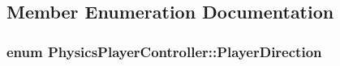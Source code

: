 \subsection{Member Enumeration Documentation}
\subsubsection[{\texorpdfstring{Player\+Direction}{PlayerDirection}}]{\setlength{\rightskip}{0pt plus 5cm}enum {\bf Physics\+Player\+Controller\+::\+Player\+Direction}}\hypertarget{classPhysicsPlayerController_a947993cc77a553b6a30c9ea95c81de5e}{}\label{classPhysicsPlayerController_a947993cc77a553b6a30c9ea95c81de5e}
